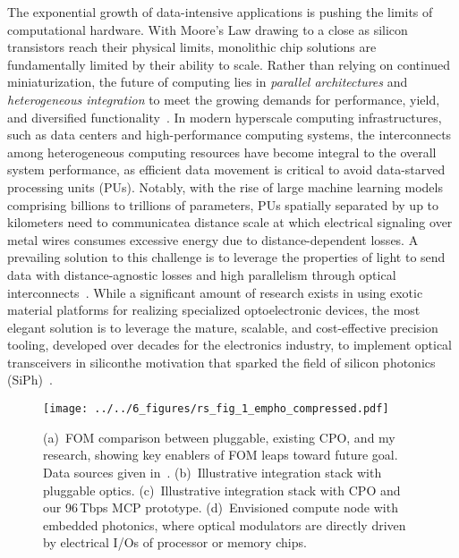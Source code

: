 The exponential growth of data-intensive applications is pushing the limits of computational hardware. With Moore's Law drawing to a close as silicon transistors reach their physical limits, monolithic chip solutions are fundamentally limited by their ability to scale. Rather than relying on continued miniaturization, the future of computing lies in \emph{parallel architectures} and \emph{heterogeneous integration} to meet the growing demands for performance, yield, and diversified functionality~\cite{iyerHeterogeneousIntegrationPerformance2016}. In modern hyperscale computing infrastructures, such as data centers and high-performance computing systems, the interconnects among heterogeneous computing resources have become integral to the overall system performance, as efficient data movement is critical to avoid data-starved processing units (PUs). Notably, with the rise of large machine learning models comprising billions to trillions of parameters, PUs spatially separated by up to kilometers need to communicate\textemdash{}a distance scale at which electrical signaling over metal wires consumes excessive energy due to distance-dependent losses. A prevailing solution to this challenge is to leverage the properties of light to send data with distance-agnostic losses and high parallelism through optical interconnects~\cite{millerRationaleChallengesOptical2000}. While a significant amount of research exists in using exotic material platforms for realizing specialized optoelectronic devices, the most elegant solution is to leverage the mature, scalable, and cost-effective precision tooling, developed over decades for the electronics industry, to implement optical transceivers in silicon\textemdash{}the motivation that sparked the field of silicon photonics (SiPh)~\cite{sorefPresentFutureSilicon2006}.

\begin{wrapfigure}{r}{0.4\textwidth}
    \vspace{-1em}
    \begin{center}
        \texttt{[image: ../../6\_figures/rs\_fig\_1\_empho\_compressed.pdf]}
    \end{center}
    \caption{(a)~FOM comparison between pluggable, existing CPO, and my research, showing key enablers of FOM leaps toward future goal. Data sources given in~\cite{wangCoDesignedSiliconPhotonics2024}. (b)~Illustrative integration stack with pluggable optics. (c)~Illustrative integration stack with CPO and our 96\,Tbps MCP prototype. (d)~Envisioned compute node with embedded photonics, where optical modulators are directly driven by electrical I/Os of processor or memory chips.}
    \label{fig:embedded_photonics}
    \vspace{-3em}
\end{wrapfigure}

